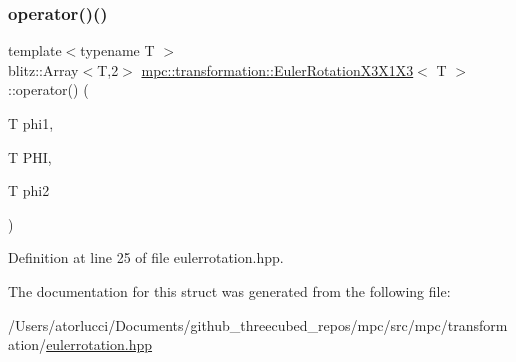\subsubsection{\texorpdfstring{operator()()}{operator()()}}
{\footnotesize\ttfamily template$<$typename T $>$ \\
blitz\+::\+Array$<$T,2$>$ \mbox{\hyperlink{structmpc_1_1transformation_1_1_euler_rotation_x3_x1_x3}{mpc\+::transformation\+::\+Euler\+Rotation\+X3\+X1\+X3}}$<$ T $>$\+::operator() (\begin{DoxyParamCaption}\item[{T}]{phi1,  }\item[{T}]{P\+HI,  }\item[{T}]{phi2 }\end{DoxyParamCaption})\hspace{0.3cm}{\ttfamily [inline]}}



Definition at line 25 of file eulerrotation.\+hpp.



The documentation for this struct was generated from the following file\+:\begin{DoxyCompactItemize}
\item 
/\+Users/atorlucci/\+Documents/github\+\_\+threecubed\+\_\+repos/mpc/src/mpc/transformation/\mbox{\hyperlink{eulerrotation_8hpp}{eulerrotation.\+hpp}}\end{DoxyCompactItemize}
